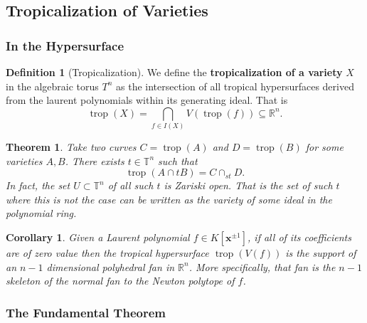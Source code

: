 \documentclass[12pt,a4paper]{amsart}
\newcommand{\trop}[1]{\operatorname{trop}(#1)}
\newcommand{\st}[2]{#1\cap_{st} #2}
\newcommand{\R}{\mathbb{R}}
\newcommand{\T}{\mathbb{T}}
\newtheorem{thm}{Theorem}[section]
\newtheorem{cor}{Corollary}[thm]
\theoremstyle{definition}
\newtheorem{defn}{Definition}[section]
\theoremstyle{remark}
\begin{document}
\subsection{Tropicalization of Varieties}

\subsubsection{In the Hypersurface}

\begin{defn}[Tropicalization]
We define the \textbf{tropicalization of a variety} $X$ in the algebraic torus $T^n$ as the intersection of all tropical hypersurfaces derived from the laurent polynomials within its generating ideal. That is
\begin{equation}
    \trop{X} = \bigcap_{f\in I(X)} V(\trop{f}) \subseteq \R^n.
\end{equation}
\end{defn}

\begin{thm}
Take two curves $C = \trop{A}$ and $D = \trop{B}$ for some varieties $A,B$. There exists $t\in\T^n$ such that
\begin{equation}
    \trop{A\cap t B} = \st{C}{D}.
\end{equation}
In fact, the set $U\subset \T^n$ of all such $t$ is Zariski open. That is the set of such $t$ where this is not the case can be written as the variety of some ideal in the polynomial ring.
\end{thm}

\begin{cor}
Given a Laurent polynomial $f\in K[\mathbf{x}^{\pm1}]$, if all of its coefficients are of zero value then the tropical hypersurface $\trop{V(f)}$ is the support of an $n-1$ dimensional polyhedral fan in $\R^n$. More specifically, that fan is the $n-1$ skeleton of the normal fan to the Newton polytope of $f$.
\end{cor}



\subsubsection{The Fundamental Theorem}
\end{document}
